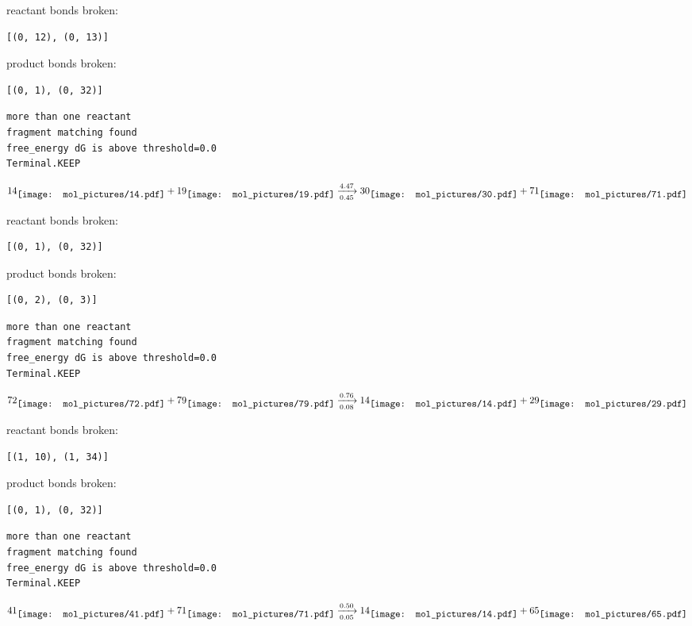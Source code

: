 \documentclass{article}
\begin{document}
reactant bonds broken:\begin{verbatim}
[(0, 12), (0, 13)]
\end{verbatim}
product bonds broken:\begin{verbatim}
[(0, 1), (0, 32)]
\end{verbatim}




\vspace{1cm}
\begin{verbatim}
more than one reactant
fragment matching found
free_energy dG is above threshold=0.0
Terminal.KEEP
\end{verbatim}
$$
14
\raisebox{-.5\height}{\texttt{[image: mol\_pictures/14.pdf]}}
+
19
\raisebox{-.5\height}{\texttt{[image: mol\_pictures/19.pdf]}}
\xrightarrow[0.45]{4.47}
30
\raisebox{-.5\height}{\texttt{[image: mol\_pictures/30.pdf]}}
+
71
\raisebox{-.5\height}{\texttt{[image: mol\_pictures/71.pdf]}}
$$


reactant bonds broken:\begin{verbatim}
[(0, 1), (0, 32)]
\end{verbatim}
product bonds broken:\begin{verbatim}
[(0, 2), (0, 3)]
\end{verbatim}




\vspace{1cm}
\begin{verbatim}
more than one reactant
fragment matching found
free_energy dG is above threshold=0.0
Terminal.KEEP
\end{verbatim}
$$
72
\raisebox{-.5\height}{\texttt{[image: mol\_pictures/72.pdf]}}
+
79
\raisebox{-.5\height}{\texttt{[image: mol\_pictures/79.pdf]}}
\xrightarrow[0.08]{0.76}
14
\raisebox{-.5\height}{\texttt{[image: mol\_pictures/14.pdf]}}
+
29
\raisebox{-.5\height}{\texttt{[image: mol\_pictures/29.pdf]}}
$$


reactant bonds broken:\begin{verbatim}
[(1, 10), (1, 34)]
\end{verbatim}
product bonds broken:\begin{verbatim}
[(0, 1), (0, 32)]
\end{verbatim}




\vspace{1cm}
\begin{verbatim}
more than one reactant
fragment matching found
free_energy dG is above threshold=0.0
Terminal.KEEP
\end{verbatim}
$$
41
\raisebox{-.5\height}{\texttt{[image: mol\_pictures/41.pdf]}}
+
71
\raisebox{-.5\height}{\texttt{[image: mol\_pictures/71.pdf]}}
\xrightarrow[0.05]{0.50}
14
\raisebox{-.5\height}{\texttt{[image: mol\_pictures/14.pdf]}}
+
65
\raisebox{-.5\height}{\texttt{[image: mol\_pictures/65.pdf]}}
$$
\end{document}
